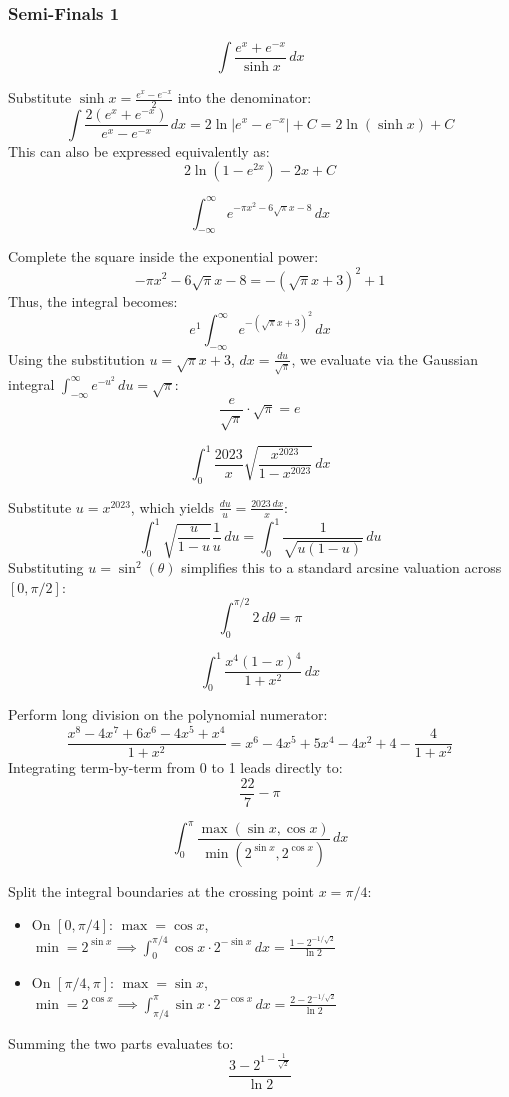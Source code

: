 \subsubsection*{Semi-Finals 1}
\begin{questions}

\question
\[ \int \frac{e^x + e^{-x}}{\sinh x} \,dx \]
\begin{solution}
Substitute $\sinh x = \frac{e^x - e^{-x}}{2}$ into the denominator:
\[ \int \frac{2(e^x + e^{-x})}{e^x - e^{-x}} \,dx = 2\ln|e^x - e^{-x}| + C = 2\ln(\sinh x) + C \]
This can also be expressed equivalently as:
\[ 2\ln(1-e^{2x}) - 2x + C \]
\end{solution}

\question
\[ \int_{-\infty}^\infty e^{-\pi x^2 - 6\sqrt{\pi}x - 8} \,dx \]
\begin{solution}
Complete the square inside the exponential power:
\[ -\pi x^2 - 6\sqrt{\pi}x - 8 = -(\sqrt{\pi}x + 3)^2 + 1 \]
Thus, the integral becomes:
\[ e^1 \int_{-\infty}^\infty e^{-(\sqrt{\pi}x + 3)^2} \,dx \]
Using the substitution $u = \sqrt{\pi}x + 3$, $dx = \frac{du}{\sqrt{\pi}}$, we evaluate via the Gaussian integral $\int_{-\infty}^\infty e^{-u^2} \,du = \sqrt{\pi}$:
\[ \frac{e}{\sqrt{\pi}} \cdot \sqrt{\pi} = e \]
\end{solution}

\question
\[ \int_0^1 \frac{2023}{x} \sqrt{\frac{x^{2023}}{1-x^{2023}}} \,dx \]
\begin{solution}
Substitute $u = x^{2023}$, which yields $\frac{du}{u} = \frac{2023\,dx}{x}$:
\[ \int_0^1 \sqrt{\frac{u}{1-u}} \frac{1}{u} \,du = \int_0^1 \frac{1}{\sqrt{u(1-u)}} \,du \]
Substituting $u = \sin^2(\theta)$ simplifies this to a standard arcsine valuation across $[0, \pi/2]$:
\[ \int_0^{\pi/2} 2 \,d\theta = \pi \]
\end{solution}

\question
\[ \int_0^1 \frac{x^4(1-x)^4}{1+x^2} \,dx \]
\begin{solution}
Perform long division on the polynomial numerator:
\[ \frac{x^8 - 4x^7 + 6x^6 - 4x^5 + x^4}{1+x^2} = x^6 - 4x^5 + 5x^4 - 4x^2 + 4 - \frac{4}{1+x^2} \]
Integrating term-by-term from 0 to 1 leads directly to:
\[ \frac{22}{7} - \pi \]
\end{solution}

\question
\[ \int_0^\pi \frac{\max(\sin x, \cos x)}{\min(2^{\sin x}, 2^{\cos x})} \,dx \]
\begin{solution}
Split the integral boundaries at the crossing point $x = \pi/4$:
\begin{itemize}
    \item On $[0, \pi/4]$: $\max = \cos x$, $\min = 2^{\sin x} \implies \int_0^{\pi/4} \cos x \cdot 2^{-\sin x} \,dx = \frac{1 - 2^{-1/\sqrt{2}}}{\ln 2}$
    \item On $[\pi/4, \pi]$: $\max = \sin x$, $\min = 2^{\cos x} \implies \int_{\pi/4}^\pi \sin x \cdot 2^{-\cos x} \,dx = \frac{2 - 2^{-1/\sqrt{2}}}{\ln 2}$
\end{itemize}
Summing the two parts evaluates to:
\[ \frac{3 - 2^{1-\frac{1}{\sqrt{2}}}}{\ln 2} \]
\end{solution}


\end{questions}
